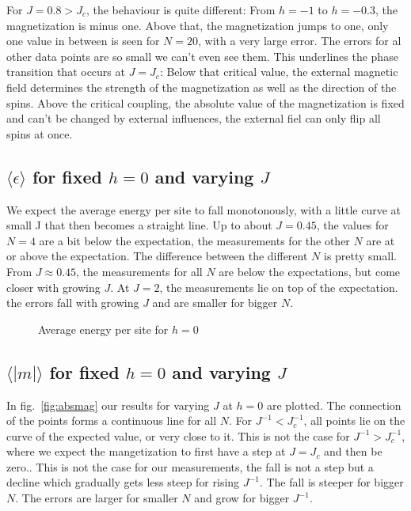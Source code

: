 \documentclass{scrartcl}
\begin{document}
For $J=0.8>J_c$, the behaviour is quite different: From $h=-1$ to $h=-0.3$, the magnetization is minus one. Above that, the magnetization jumps to one, only one value in between is seen for $N=20$, with a very large error. The errors for al other data points are so small we can't even see them. This underlines the phase transition that occurs at $J=J_c$: Below that critical value, the external magnetic field determines the strength of the magnetization as well as the direction of the spins. Above the critical coupling, the absolute value of the magnetization is fixed and can't be changed by external influences, the external fiel can only flip all spins at once.


\subsection{$\langle \epsilon\rangle$ for fixed $h=0$ and varying $J$}
We expect the average energy per site to fall monotonously, with a little curve at small J that then becomes a straight line. Up to about $J=0.45$, the values for $N=4$ are a bit below the expectation, the measurements for the other $N$ are at or above the expectation. The difference between the different $N$ is pretty small. From $J\approx0.45$, the measurements for all $N$ are below the expectations, but come closer with growing $J$. At $J=2$, the measurements lie on top of the expectation. the errors fall with growing $J$ and are smaller for bigger $N$.

	\begin{figure}[htbp]
		
		\caption{Average energy per site for $h=0$}
		\label{fig:energy}
	\end{figure}

\subsection{$\langle |m|\rangle$ for fixed $h=0$ and varying $J$}
In fig.~\ref{fig:absmag} our results for varying $J$ at $h=0$ are plotted. The connection of the points forms a continuous line for all $N$. For $J^{-1}<J_c^{-1}$, all points lie on the curve of the expected value, or very close to it. This is not the case for $J^{-1}>J_c^{-1}$, where we expect the mangetization to first have a step at $J=J_c$ and then be zero.. This is not the case for our measurements, the fall is not a step but a decline which gradually gets less steep for rising $J^{-1}$. The fall is steeper for bigger $N$. The errors are larger for smaller $N$ and grow for bigger $J^{-1}$.
\end{document}
